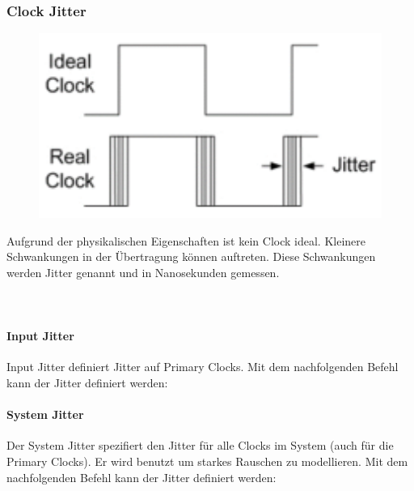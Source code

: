 \subsubsection{Clock Jitter}
\begin{minipage}{0.3\textwidth}
    \begin{figure}[H]
        \includegraphics[width=1\textwidth]{images/clock_jitter.png}
    \end{figure}
\end{minipage}
\hfill
\begin{minipage}{0.65\textwidth}
    Aufgrund der physikalischen Eigenschaften ist kein Clock ideal. Kleinere Schwankungen in der Übertragung können auftreten. Diese Schwankungen werden Jitter genannt und in Nanosekunden gemessen. \ \\ \ \\ \ \\
\end{minipage}

\paragraph{Input Jitter}
Input Jitter definiert Jitter auf Primary Clocks. Mit dem nachfolgenden Befehl kann der Jitter definiert werden:


\paragraph{System Jitter}
Der System Jitter spezifiert den Jitter für alle Clocks im System (auch für die Primary Clocks). Er wird benutzt um starkes Rauschen zu modellieren. Mit dem nachfolgenden Befehl kann der Jitter definiert werden:



